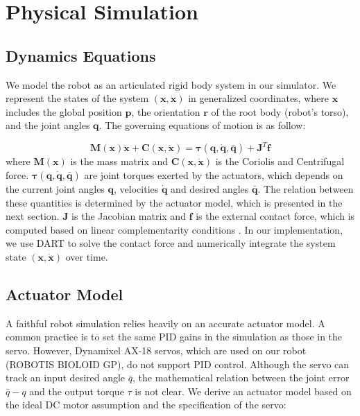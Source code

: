 \section{Physical Simulation}

\subsection{Dynamics Equations}

We model the robot as an articulated rigid body system in our simulator. We represent the states of the system $(\mathbf{x}, \dot{\mathbf{x}})$ in generalized coordinates, where $\mathbf{x}$ includes the global position $\mathbf{p}$, the orientation $\mathbf{r}$ of the root body (robot's torso), and the joint angles $\mathbf{q}$. The governing equations of motion is as follow:

\begin{equation}
\label{eq:robotdynamics}
\mathbf{M}(\mathbf{x})\mathbf{\ddot{x}}+\mathbf{C}(\mathbf{x},\mathbf{\dot{x}})=\boldsymbol{\tau}(\mathbf{q}, \dot{\mathbf{q}}, \bar{\mathbf{q}})+\mathbf{J}^T\mathbf{f}
\end{equation}
where $\mathbf{M}(\mathbf{x})$ is the mass matrix and $\mathbf{C}(\mathbf{x},\mathbf{\dot{x}})$ is the Coriolis and Centrifugal force. $\boldsymbol{\tau}(\mathbf{q}, \dot{\mathbf{q}}, \bar{\mathbf{q}})$ are joint torques exerted by the actuators, which depends on the current joint angles $\mathbf{q}$, velocities $\dot{\mathbf{q}}$ and desired angles $\bar{\mathbf{q}}$. The relation between these quantities is determined by the actuator model, which is presented in the next section. $\mathbf{J}$ is the Jacobian matrix and $\mathbf{f}$ is the external contact force, which is computed based on linear complementarity conditions \cite{Tan:2012b}. In our implementation, we use DART to solve the contact force and numerically integrate the system state $(\mathbf{x}, \dot{\mathbf{x}})$ over time.

\subsection{Actuator Model}
\label{sec:motorDynamics}
A faithful robot simulation relies heavily on an accurate actuator model. A common practice is to set the same PID gains in the simulation as those in the servo. However, Dynamixel AX-18 servos, which are used on our robot (ROBOTIS BIOLOID GP), do not support PID control. Although the servo can track an input desired angle $\bar{q}$, the mathematical relation between the joint error $\bar{q}-q$ and the output torque $\tau$ is not clear. We derive an actuator model based on the ideal DC motor assumption and the specification of the servo:

